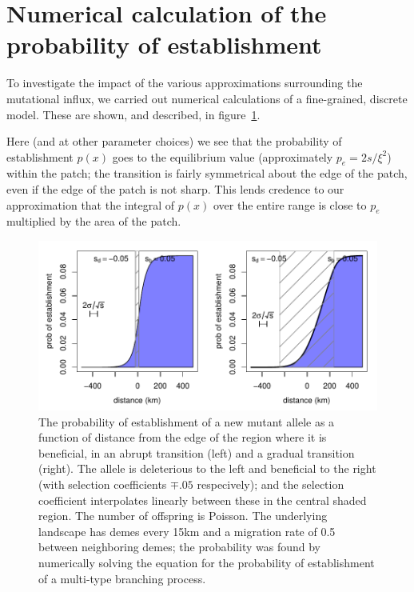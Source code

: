 \documentclass{article}
\begin{document}
\section{Numerical calculation of the probability of establishment}
\label{apx:establishment_sims}

To investigate the impact of the various approximations surrounding the mutational influx,
we carried out numerical calculations of a fine-grained, discrete model.
These are shown, and described, in figure~\ref{fig:prob_estab_calcs}.

Here (and at other parameter choices) we see that the probability of establishment $p(x)$ goes to the equilibrium value
(approximately $p_e = 2s/\xi^2$) within the patch;
the transition is fairly symmetrical about the edge of the patch, even if the edge of the patch is not sharp.
This lends credence to our approximation that the integral of $p(x)$ over the entire range
is close to $p_e$ multiplied by the area of the patch.

\begin{figure}[ht!]
    \begin{center}
        \includegraphics{prob-establishment}
    \end{center}
    \label{fig:prob_estab_calcs}
    \caption{The probability of establishment of a new mutant allele as a function of distance from the edge of the region where it is beneficial,
    in an abrupt transition (left) and a gradual transition (right).
    The allele is deleterious to the left and beneficial to the right (with selection coefficients $\mp .05$ respecively);
    and the selection coefficient interpolates linearly between these in the central shaded region.
    The number of offspring is Poisson.
    The underlying landscape has demes every 15km and a migration rate of 0.5 between neighboring demes;
    the probability was found by numerically solving the equation for the probability of establishment of a multi-type branching process.
    }
\end{figure}
\end{document}
